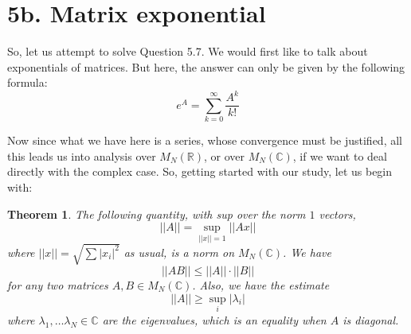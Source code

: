 \documentclass[12pt]{amsbook}
\newtheorem{theorem}{Theorem}[chapter]
\begin{document}
\section*{5b. Matrix exponential} 

So, let us attempt to solve Question 5.7. We would first like to talk about exponentials of matrices. But here, the answer can only be given by the following formula:
$$e^A=\sum_{k=0}^\infty\frac{A^k}{k!}$$

Now since what we have here is a series, whose convergence must be justified, all this leads us into analysis over $M_N(\mathbb R)$, or over $M_N(\mathbb C)$, if we want to deal directly with the complex case. So, getting started with our study, let us begin with:

\begin{theorem}
The following quantity, with sup over the norm $1$ vectors,
$$||A||=\sup_{||x||=1}||Ax||$$
where $||x||=\sqrt{\sum|x_i|^2}$ as usual, is a norm on $M_N(\mathbb C)$. We have
$$||AB||\leq||A||\cdot||B||$$
for any two matrices $A,B\in M_N(\mathbb C)$. Also, we have the estimate
$$||A||\geq\sup_i|\lambda_i|$$
where $\lambda_1,\ldots\lambda_N\in\mathbb C$ are the eigenvalues, which is an equality when $A$ is diagonal.
\end{theorem}
\end{document}

